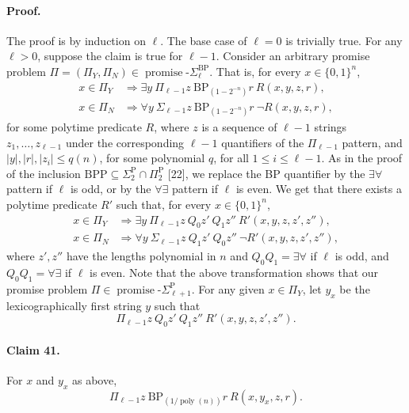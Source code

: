 \documentclass[10pt,a4paper]{article}
\begin{document}
\paragraph{Proof.} The proof is by induction on $\ell$. The base case of $\ell=0$ is trivially true.
For any $\ell>0$, suppose the claim is true for $\ell-1$. Consider an arbitrary promise problem $\Pi=(\Pi_Y,\Pi_N)\in\operatorname{promise}\text{-}\Sigma_\ell^{\mathrm{BP}}$. That is, for every $x\in\{0,1\}^n$,
\begin{align*}
x\in\Pi_Y&\Longrightarrow\exists y\ \Pi_{\ell-1}z\ \mathrm{BP}_{(1-2^{-n})}r\ R(x,y,z,r),\\
x\in\Pi_N&\Longrightarrow\forall y\ \Sigma_{\ell-1}z\ \mathrm{BP}_{(1-2^{-n})}r\ \neg R(x,y,z,r),
\end{align*}
for some polytime predicate $R$, where $z$ is a sequence of $\ell-1$ strings $z_1,\ldots,z_{\ell-1}$ under the corresponding $\ell-1$ quantifiers of the $\Pi_{\ell-1}$ pattern, and $|y|,|r|,|z_i|\leq q(n)$, for some polynomial $q$, for all $1\leq i\leq\ell-1$.
As in the proof of the inclusion $\mathrm{BPP}\subseteq\Sigma_2^{\mathrm P}\cap\Pi_2^{\mathrm P}$ [22], we replace the BP quantifier by the $\exists\forall$ pattern if $\ell$ is odd, or by the $\forall\exists$ pattern if $\ell$ is even. We get that there exists a polytime predicate $R'$ such that, for every $x\in\{0,1\}^n$,
\begin{align*}
x\in\Pi_Y&\Longrightarrow\exists y\ \Pi_{\ell-1}z\ Q_0z'\ Q_1z''\ R'(x,y,z,z',z''),\\
x\in\Pi_N&\Longrightarrow\forall y\ \Sigma_{\ell-1}z\ Q_1z'\ Q_0z''\ \neg R'(x,y,z,z',z''),
\end{align*}
where $z',z''$ have the lengths polynomial in $n$ and $Q_0Q_1=\exists\forall$ if $\ell$ is odd, and $Q_0Q_1=\forall\exists$ if $\ell$ is even.
Note that the above transformation shows that our promise problem $\Pi\in\operatorname{promise}\text{-}\Sigma_{\ell+1}^{\mathrm P}$. For any given $x\in\Pi_Y$, let $y_x$ be the lexicographically first string $y$ such that
\[\Pi_{\ell-1}z\ Q_0z'\ Q_1z''\ R'(x,y,z,z',z'').\tag{23}\]
\paragraph{Claim 41.} For $x$ and $y_x$ as above,
\[\Pi_{\ell-1}z\ \mathrm{BP}_{(1/\operatorname{poly}(n))}r\ R(x,y_x,z,r).\]
\end{document}
